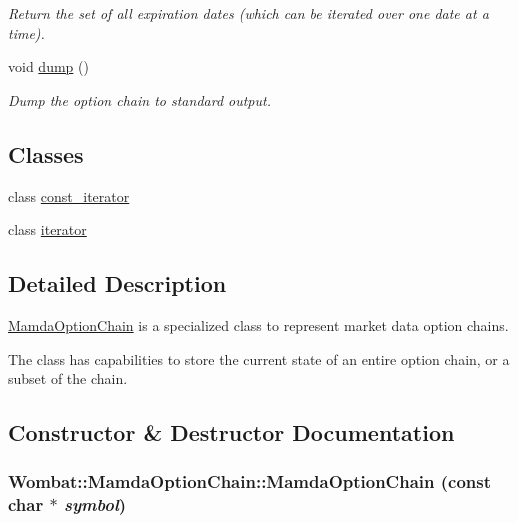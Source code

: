 \begin{CompactItemize}
\begin{CompactList}\small\item\em Return the set of all expiration dates (which can be iterated over one date at a time). \item\end{CompactList}\item 
void \hyperlink{classWombat_1_1MamdaOptionChain_9149b46f6ba398eb7f3ef458cc43a09c}{dump} ()
\begin{CompactList}\small\item\em Dump the option chain to standard output. \item\end{CompactList}\end{CompactItemize}
\subsection*{Classes}
\begin{CompactItemize}
\item 
class \hyperlink{classWombat_1_1MamdaOptionChain_1_1const__iterator}{const\_\-iterator}
\item 
class \hyperlink{classWombat_1_1MamdaOptionChain_1_1iterator}{iterator}
\end{CompactItemize}


\subsection{Detailed Description}
\hyperlink{classWombat_1_1MamdaOptionChain}{Mamda\-Option\-Chain} is a specialized class to represent market data option chains. 

The class has capabilities to store the current state of an entire option chain, or a subset of the chain. 



\subsection{Constructor \& Destructor Documentation}
\hypertarget{classWombat_1_1MamdaOptionChain_c696e591f54e1237478eb9fb03fde9ad}{
\subsubsection[MamdaOptionChain]{\setlength{\rightskip}{0pt plus 5cm}Wombat::Mamda\-Option\-Chain::Mamda\-Option\-Chain (const char $\ast$ {\em symbol})}}
\label{classWombat_1_1MamdaOptionChain_c696e591f54e1237478eb9fb03fde9ad}


